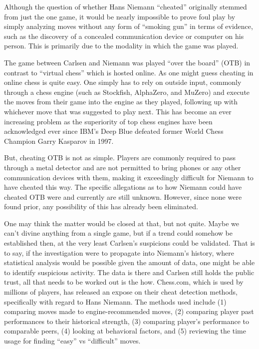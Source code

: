 \documentclass[12pt, letterpaper, titlepage]{article}
\begin{document}
Although the question of whether Hans Niemann “cheated” originally stemmed from just the one game, it would be nearly impossible to prove foul play by simply analyzing moves without any form of “smoking gun” in terms of evidence, such as the discovery of a concealed communication device or computer on his person. This is primarily due to the modality in which the game was played.

The game between Carlsen and Niemann was played “over the board” (OTB) in contrast to “virtual chess” which is hosted online. As one might guess cheating in online chess is quite easy. One simply has to rely on outside input, commonly through a chess engine (such as Stockfish, AlphaZero, and MuZero) and execute the moves from their game into the engine as they played, following up with whichever move that was suggested to play next. This has become an ever increasing problem as the superiority of top chess engines have been acknowledged ever since IBM's Deep Blue defeated former World Chess Champion Garry Kasparov in 1997.

But, cheating OTB is not as simple. Players are commonly required to pass through a metal detector and are not permitted to bring phones or any other communication devices with them, making it exceedingly difficult for Niemann to have cheated this way. The specific allegations as to how Niemann could have cheated OTB were and currently are still unknown. However, since none were found prior, any possibility of this has already been eliminated.

One may think the matter would be closed at that, but not quite. Maybe we can't divine anything from a single game, but if a trend could somehow be established then, at the very least Carlsen's suspicions could be validated. That is to say, if the investigation were to propagate into Niemann's history, where statistical analysis would be possible given the amount of data, one might be able to identify suspicious activity. The data is there and Carlsen still holds the public trust, all that needs to be worked out is the how.
Chess.com, which is used by millions of players, has released an expose on their cheat detection methods, specifically with regard to Hans Niemann. The methods used include (1) comparing moves made to engine-recommended moves, (2) comparing player past performances to their historical strength, (3) comparing player's performance to comparable peers, (4) looking at behavioral factors, and (5) reviewing the time usage for finding “easy” vs “difficult” moves.
\end{document}
